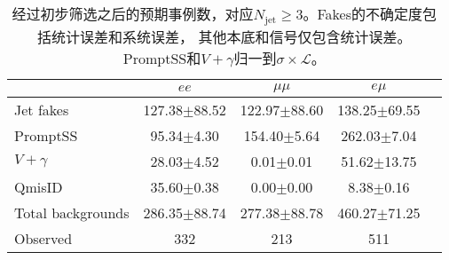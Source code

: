\begin{table}[h]
\begin{center}
\begin{tabular}{l|cccc}
\hline
\hline
                 &$ee$              &$\mu\mu$            &$e\mu$       \\
\hline
Jet fakes        &127.38$\pm$88.52       &122.97$\pm$88.60       &138.25$\pm$69.55 \\
 PromptSS        &95.34$\pm$4.30       &154.40$\pm$5.64       &262.03$\pm$7.04\\
$V+\gamma$        &28.03$\pm$4.52       &0.01$\pm$0.01       &51.62$\pm$13.75\\
   QmisID        &35.60$\pm$0.38       &0.00$\pm$0.00       &8.38$\pm$0.16\\
\hline
Total backgrounds       &286.35$\pm$88.74       &277.38$\pm$88.78       &460.27$\pm$71.25 \\
Observed        &332       &213       &511 \\
\hline
\hline
\end{tabular}
\caption{经过初步筛选之后的预期事例数，对应$N_{\text{jet}}\geq3$。Fakes的不确定度包括统计误差和系统误差，
其他本底和信号仅包含统计误差。PromptSS和$V+\gamma$归一到$\sigma\times\mathcal{L}$。}
\label{tab:event_yield_high_Njet_CR}
\end{center}
\end{table}
